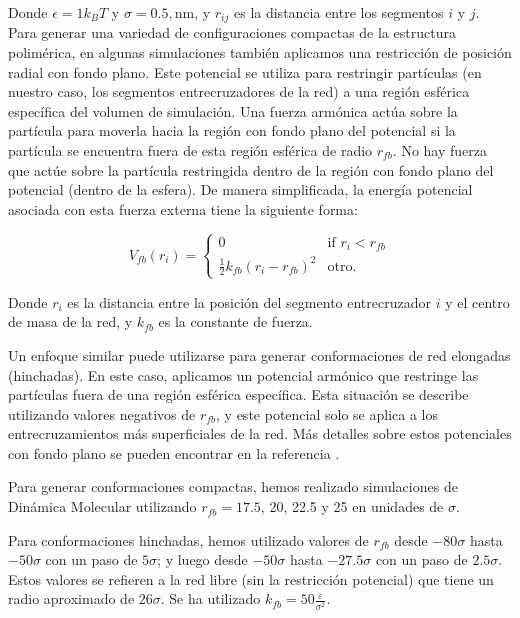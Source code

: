 Donde $\epsilon = 1 k_BT$ y $\sigma = 0.5 , $nm, y $r_{ij}$ es la distancia entre los segmentos $i$ y $j$.
Para generar una variedad de configuraciones compactas de la estructura polim\'erica, en algunas simulaciones tambi\'en aplicamos una restricci\'on de posici\'on radial con fondo plano.
Este potencial se utiliza para restringir part\'iculas (en nuestro caso, los segmentos entrecruzadores de la red) a una regi\'on esf\'erica espec\'ifica del volumen de simulaci\'on.
Una fuerza arm\'onica act\'ua sobre la part\'icula para moverla hacia la regi\'on con fondo plano del potencial si la part\'icula se encuentra fuera de esta regi\'on esf\'erica de radio $r_{fb}$.
No hay fuerza que act\'ue sobre la part\'icula restringida dentro de la regi\'on con fondo plano del potencial (dentro de la esfera).
De manera simplificada, la energ\'ia potencial asociada con esta fuerza externa tiene la siguiente forma:

\begin{equation}
	V_{fb}(r_i)=\begin{cases}
		0 & \text{if $r_{i} < r_{fb}$}\\
		\frac{1}{2}k_{fb}\left(r_i -r_{fb}\right)^2 & \text{otro}.
	\end{cases}
\end{equation}


Donde $r_i$ es la distancia entre la posici\'on del segmento entrecruzador $i$ y el centro de masa de la red, y $k_{fb}$ es la constante de fuerza.

Un enfoque similar puede utilizarse para generar conformaciones de red elongadas (hinchadas). En este caso, aplicamos un potencial arm\'onico que restringe las part\'iculas fuera de una regi\'on esférica espec\'ifica. Esta situaci\'on se describe utilizando valores negativos de $r_{fb}$, y este potencial solo se aplica a los entrecruzamientos m\'as superficiales de la red. M\'as detalles sobre estos potenciales con fondo plano se pueden encontrar en la referencia \cite{GROMACSRestraints}.

Para generar conformaciones compactas, hemos realizado simulaciones de Din\'amica Molecular utilizando $r_{fb} = 17.5$, 20, 22.5 y 25 en unidades de $\sigma$.

Para conformaciones hinchadas, hemos utilizado valores de $r_{fb}$ desde $-80\sigma$ hasta $-50\sigma$ con un paso de $5\sigma$; y luego desde $-50\sigma$ hasta $-27.5\sigma$ con un paso de $2.5\sigma$. Estos valores se refieren a la red libre (sin la restricci\'on potencial) que tiene un radio aproximado de $26\sigma$.
Se ha utilizado $k_{fb} = 50\frac{\varepsilon}{\sigma^2} $.



